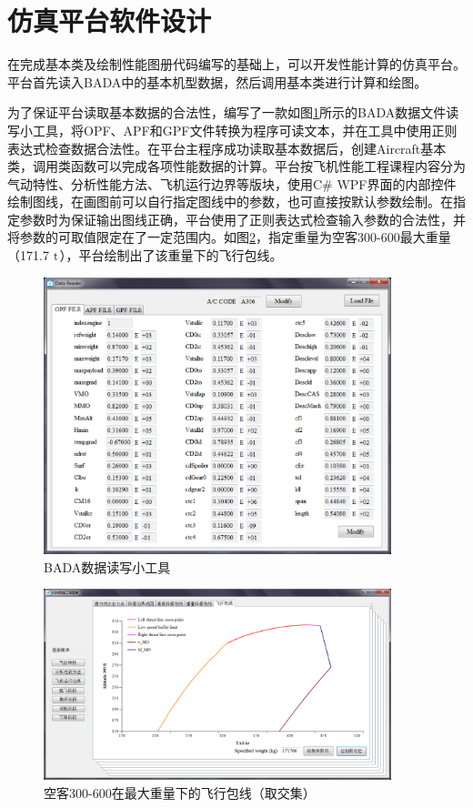 \documentclass[a4paper,punct,space,heading=true,AutoFakeBold]{ctexrep}
\begin{document}
\section{仿真平台软件设计}

在完成基本类及绘制性能图册代码编写的基础上，可以开发性能计算的仿真平台。平台首先读入BADA中的基本机型数据，然后调用基本类进行计算和绘图。

为了保证平台读取基本数据的合法性，编写了一款如图\ref{reader}所示的BADA数据文件读写小工具，将OPF、APF和GPF文件转换为程序可读文本，并在工具中使用正则表达式检查数据合法性。在平台主程序成功读取基本数据后，创建Aircraft基本类，调用类函数可以完成各项性能数据的计算。平台按飞机性能工程课程内容分为气动特性、分析性能方法、飞机运行边界等版块，使用C\# WPF界面的内部控件绘制图线，在画图前可以自行指定图线中的参数，也可直接按默认参数绘制。在指定参数时为保证输出图线正确，平台使用了正则表达式检查输入参数的合法性，并将参数的可取值限定在了一定范围内。如图\ref{flightenvelopetrimmaxW}，指定重量为空客300-600最大重量（171.7 $\rm t$），平台绘制出了该重量下的飞行包线。


\begin{figure}[h]
	\centering
	\includegraphics[width=0.9\textwidth]{pic/reader.eps}\hspace{30pt}
	\caption{BADA数据读写小工具}\label{reader}
\end{figure}


\begin{figure}[h]
	\centering
	\includegraphics[width=0.9\textwidth]{pic/flightenvelopetrimmaxW.eps}\hspace{30pt}
	\caption{空客300-600在最大重量下的飞行包线（取交集）}\label{flightenvelopetrimmaxW}
\end{figure}
\end{document}
